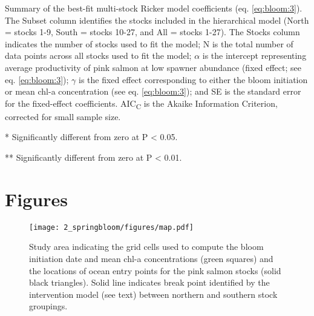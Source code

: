 \newpage
\begin{table}[!ht]
  \small \centering \libertineLF
  \caption[Summary of the best-fit multi-stock Ricker model
           coefficients.]{Summary of the best-fit multi-stock Ricker model
           coefficients (eq. \ref{eq:bloom:3}). The Subset column identifies the
           stocks included in the hierarchical model (North = stocks 1-9, South
           = stocks 10-27, and All = stocks 1-27). The Stocks column indicates
           the number of stocks used to fit the model; N is the total number of
           data points across all stocks used to fit the model; $\alpha$ is the
           intercept representing average productivity of pink salmon at low
           spawner abundance (fixed effect; see eq. \ref{eq:bloom:3}); $\gamma$
           is the fixed effect corresponding to either the bloom initiation or
           mean chl-a concentration (see eq. \ref{eq:bloom:3}); and SE is the
           standard error for the fixed-effect coefficients.
           AIC\textsubscript{C} is the Akaike Information Criterion, corrected
           for small sample size.}
  \begin{threeparttable}
    
    \begin{tablenotes}
      {\footnotesize
        \item[*] Significantly different from zero at P \textless{} 0.05. 
        \item[**] Significantly different from zero at P \textless{} 0.01. 
      }
    \end{tablenotes}
  \end{threeparttable}
  \label{tab:bloom:2}
\end{table}



\section{Figures}

\begin{figure}[htbp]
  \centering \texttt{[image: 2\_springbloom/figures/map.pdf]}
  \caption[Study area indicating chl-a grid cells and ocean entry locations for
    pink salmon stocks.]{Study area indicating the grid cells used to compute the
    bloom initiation date and mean chl-a concentrations (green squares) and the
    locations of ocean entry points for the pink salmon stocks (solid black
    triangles). Solid line indicates break point identified by the intervention
    model (see text) between northern and southern stock groupings.}
  \label{fig:bloom:1}
\end{figure}

